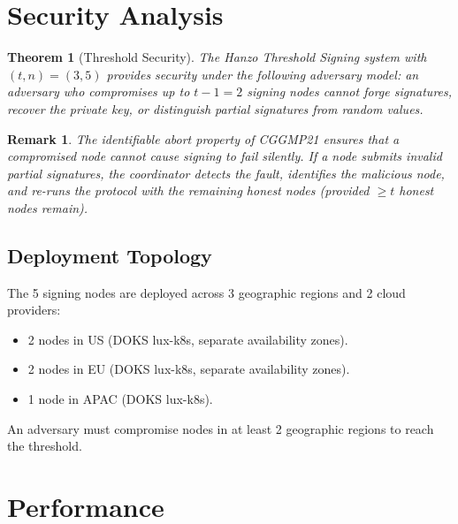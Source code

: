 \documentclass[11pt]{article}
\newtheorem{theorem}{Theorem}
\newtheorem{remark}{Remark}
\begin{document}
\section{Security Analysis}
\label{sec:security}

\begin{theorem}[Threshold Security]
The Hanzo Threshold Signing system with $(t, n) = (3, 5)$ provides security
under the following adversary model: an adversary who compromises up to $t-1 = 2$
signing nodes cannot forge signatures, recover the private key, or distinguish
partial signatures from random values.
\end{theorem}

\begin{remark}
The identifiable abort property of CGGMP21 ensures that a compromised node
cannot cause signing to fail silently. If a node submits invalid partial
signatures, the coordinator detects the fault, identifies the malicious node,
and re-runs the protocol with the remaining honest nodes (provided $\geq t$
honest nodes remain).
\end{remark}

\subsection{Deployment Topology}

The 5 signing nodes are deployed across 3 geographic regions and 2 cloud
providers:
\begin{itemize}[leftmargin=1.1em]
    \item 2 nodes in US (DOKS lux-k8s, separate availability zones).
    \item 2 nodes in EU (DOKS lux-k8s, separate availability zones).
    \item 1 node in APAC (DOKS lux-k8s).
\end{itemize}

An adversary must compromise nodes in at least 2 geographic regions to reach
the threshold.

\section{Performance}
\label{sec:performance}
\end{document}
